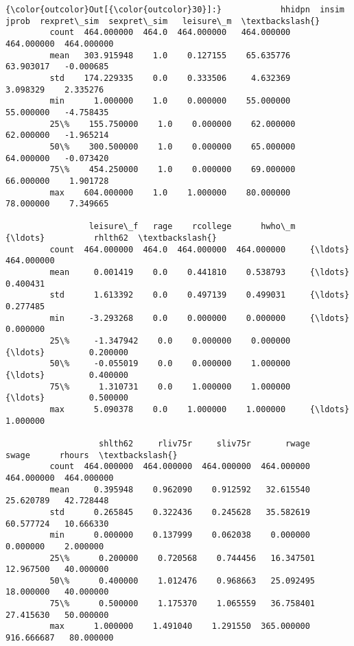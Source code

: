 \documentclass[11pt]{article}
\begin{document}
\begin{Verbatim}[commandchars=\\\{\}]
{\color{outcolor}Out[{\color{outcolor}30}]:}            hhidpn  insim       jprob  rexpret\_sim  sexpret\_sim   leisure\_m  \textbackslash{}
         count  464.000000  464.0  464.000000   464.000000   464.000000  464.000000   
         mean   303.915948    1.0    0.127155    65.635776    63.903017   -0.000685   
         std    174.229335    0.0    0.333506     4.632369     3.098329    2.335276   
         min      1.000000    1.0    0.000000    55.000000    55.000000   -4.758435   
         25\%    155.750000    1.0    0.000000    62.000000    62.000000   -1.965214   
         50\%    300.500000    1.0    0.000000    65.000000    64.000000   -0.073420   
         75\%    454.250000    1.0    0.000000    69.000000    66.000000    1.901728   
         max    604.000000    1.0    1.000000    80.000000    78.000000    7.349665   
         
                 leisure\_f   rage    rcollege      hwho\_m     {\ldots}          rhlth62  \textbackslash{}
         count  464.000000  464.0  464.000000  464.000000     {\ldots}       464.000000   
         mean     0.001419    0.0    0.441810    0.538793     {\ldots}         0.400431   
         std      1.613392    0.0    0.497139    0.499031     {\ldots}         0.277485   
         min     -3.293268    0.0    0.000000    0.000000     {\ldots}         0.000000   
         25\%     -1.347942    0.0    0.000000    0.000000     {\ldots}         0.200000   
         50\%     -0.055019    0.0    0.000000    1.000000     {\ldots}         0.400000   
         75\%      1.310731    0.0    1.000000    1.000000     {\ldots}         0.500000   
         max      5.090378    0.0    1.000000    1.000000     {\ldots}         1.000000   
         
                   shlth62     rliv75r     sliv75r       rwage       swage      rhours  \textbackslash{}
         count  464.000000  464.000000  464.000000  464.000000  464.000000  464.000000   
         mean     0.395948    0.962090    0.912592   32.615540   25.620789   42.728448   
         std      0.265845    0.322436    0.245628   35.582619   60.577724   10.666330   
         min      0.000000    0.137999    0.062038    0.000000    0.000000    2.000000   
         25\%      0.200000    0.720568    0.744456   16.347501   12.967500   40.000000   
         50\%      0.400000    1.012476    0.968663   25.092495   18.000000   40.000000   
         75\%      0.500000    1.175370    1.065559   36.758401   27.415630   50.000000   
         max      1.000000    1.491040    1.291550  365.000000  916.666687   80.000000   
         

\end{Verbatim}
\end{document}

